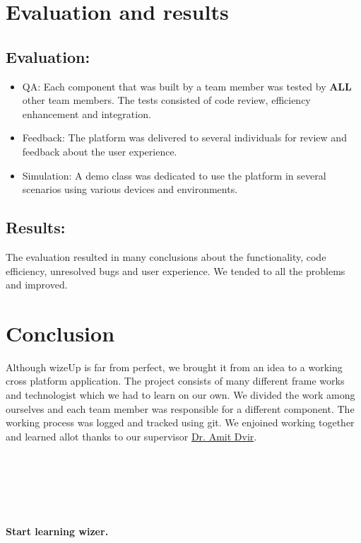 \documentclass[12pt,a4paper]{article}
\begin{document}
    \newpage
    \section{Evaluation and results}
    \subsection{Evaluation:}
    \begin{itemize}
        \item QA: Each component that was built by a team member was tested by {\textbf{ALL}} other team members. The tests consisted of code review, efficiency enhancement and integration.

        \item Feedback: The platform was delivered to several individuals for review and feedback about the user experience.

        \item Simulation: A demo class was dedicated to use the platform in several scenarios using various devices and environments.
    \end{itemize}


    \subsection{Results:}
    The evaluation resulted in many conclusions about the functionality, code efficiency, unresolved bugs and user experience. We tended to all the problems and improved.



    \newpage
    \section{Conclusion}

    Although wizeUp is far from perfect, we brought it from an idea to a working cross platform application. The project consists of many different frame works and technologist which we had to learn on our own. We divided the work among ourselves and each team member was responsible for a different component. The working process was logged and tracked using git. We enjoined working together and learned allot thanks to our supervisor {\underline{Dr. Amit Dvir}}.

    \

    \

    \

    {\centering
    {\huge \textbf{Start learning wizer.}}

    }


    \newpage
    
    
\end{document}
